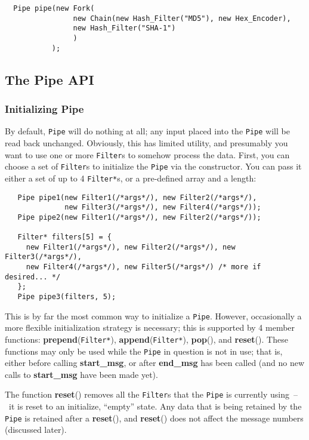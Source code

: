 \documentclass{article}
\newcommand{\function}[1]{\textbf{#1}}
\newcommand{\type}[1]{\texttt{#1}}
\begin{document}
\begin{verbatim}
  Pipe pipe(new Fork(
                new Chain(new Hash_Filter("MD5"), new Hex_Encoder),
                new Hash_Filter("SHA-1")
                )
           );
\end{verbatim}

\subsection{The Pipe API}

\subsubsection{Initializing Pipe}

By default, \type{Pipe} will do nothing at all; any input placed into
the \type{Pipe} will be read back unchanged. Obviously, this has
limited utility, and presumably you want to use one or more
\type{Filter}s to somehow process the data. First, you can choose a
set of \type{Filter}s to initialize the \type{Pipe} via the
constructor. You can pass it either a set of up to 4 \type{Filter*}s,
or a pre-defined array and a length:

\begin{verbatim}
   Pipe pipe1(new Filter1(/*args*/), new Filter2(/*args*/),
              new Filter3(/*args*/), new Filter4(/*args*/));
   Pipe pipe2(new Filter1(/*args*/), new Filter2(/*args*/));

   Filter* filters[5] = {
     new Filter1(/*args*/), new Filter2(/*args*/), new Filter3(/*args*/),
     new Filter4(/*args*/), new Filter5(/*args*/) /* more if desired... */
   };
   Pipe pipe3(filters, 5);
\end{verbatim}

This is by far the most common way to initialize a \type{Pipe}. However,
occasionally a more flexible initialization strategy is necessary; this is
supported by 4 member functions: \function{prepend}(\type{Filter*}),
\function{append}(\type{Filter*}), \function{pop}(), and \function{reset}().
These functions may only be used while the \type{Pipe} in question is not in
use; that is, either before calling \function{start\_msg}, or after
\function{end\_msg} has been called (and no new calls to \function{start\_msg}
have been made yet).

The function \function{reset}() removes all the \type{Filter}s that
the \type{Pipe} is currently using~--~it is reset to an initialize,
``empty'' state.  Any data that is being retained by the \type{Pipe}
is retained after a \function{reset}(), and \function{reset}() does
not affect the message numbers (discussed later).
\end{document}
